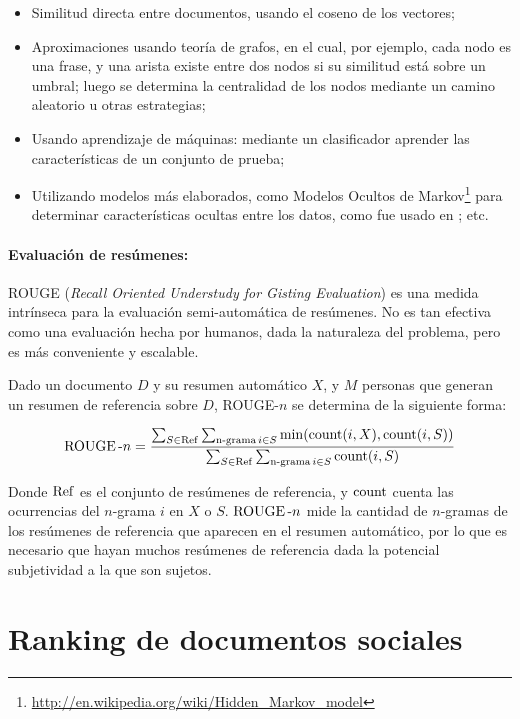 \begin{itemize}
\item Similitud directa entre documentos, usando el coseno de los
     vectores;
\item Aproximaciones usando teoría de grafos, en el cual, por ejemplo,
     cada nodo es una frase, y una arista existe entre dos nodos si su
     similitud está sobre un umbral; luego se determina la centralidad
     de los nodos mediante un camino aleatorio u otras estrategias;
\item Usando aprendizaje de máquinas: mediante un clasificador aprender
     las características de un conjunto de prueba;
\item Utilizando modelos más elaborados, como Modelos Ocultos de
     Markov\footnote{\href{http://en.wikipedia.org/wiki/Hidden\_Markov\_model}{http://en.wikipedia.org/wiki/Hidden\_Markov\_model} }
     para determinar características ocultas entre los datos, como fue
     usado en \cite{chakrabarti2011event}; etc.
\end{itemize}

\paragraph{Evaluación de resúmenes:}
\label{sec-2.4.1}


    ROUGE (\emph{Recall Oriented Understudy for Gisting Evaluation})\cite{Lin:2003:AES:1073445.1073465}
    es una medida intrínseca para la evaluación semi-automática de
    resúmenes. No es tan efectiva como una evaluación hecha por
    humanos, dada la naturaleza del problema, pero es más conveniente
    y escalable.

    Dado un documento $D$ y su resumen automático $X$, y $M$ personas
    que generan un resumen de referencia sobre $D$, ROUGE-$n$ se
    determina de la siguiente forma:

    $$\operatorname{ROUGE}\text{-}n = \frac{  \sum_{S \in \operatorname{Ref}} \sum_{\operatorname{n-grama} i \in S} \operatorname{min}( \operatorname{count}(i,X),\operatorname{count}(i,S) )   }{ \sum_{S\in \operatorname{Ref}}\sum_{\operatorname{n-grama} i \in S}  \operatorname{count}(i,S) }$$

    Donde $\operatorname{Ref}$ es el conjunto de resúmenes de referencia, y
    $\operatorname{count}$ cuenta las ocurrencias del $n$-grama $i$ en $X$ o
    $S$. $\operatorname{ROUGE}\text{-}n$ mide la cantidad de $n$-gramas de los
    resúmenes de referencia que aparecen en el resumen automático, por
    lo que es necesario que hayan muchos resúmenes de referencia dada
    la potencial subjetividad a la que son sujetos.

\section{Ranking de documentos sociales}
\label{sec-2.5}


